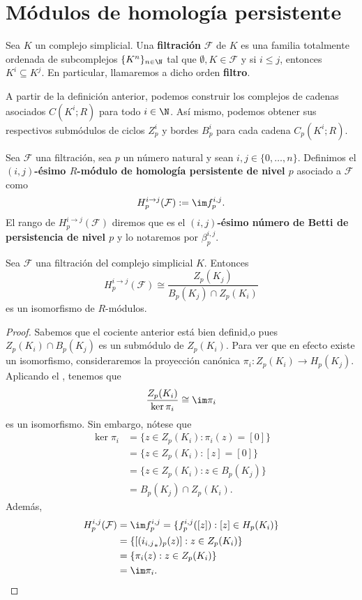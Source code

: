 \section{Módulos de homología persistente}
\begin{definicion}
	Sea \(K\) un complejo simplicial. Una \textbf{filtración} \(\mathcal{F}\) de \(K\) es una familia totalmente ordenada de subcomplejos \(\{K^n\}_{n \in \N}\) tal que \(\emptyset, K \in \mathcal{F}\) y si \(i \leq j\), entonces \(K^i \subseteq K^j\). En particular, llamaremos a dicho orden \textbf{filtro}.
\end{definicion}
A partir de la definición anterior, podemos construir los complejos de cadenas asociados \(C(K^i;R)\) para todo \(i \in \N\). Así mismo, podemos obtener sus respectivos submódulos de ciclos \(Z^i_p\) y bordes \(B^i_p\) para cada cadena \(C_p(K^i;R)\).
\begin{definicion}
	Sea \(\mathcal{F}\) una filtración, sea \(p\) un número natural y sean \(i,j \in \{0, \dots, n\}\). Definimos el  \textbf{\((i,j)\)-ésimo \(R\)-módulo de homología persistente de nivel \(p\)} asociado a \(\mathcal{F}\) como
	\[
		H_p^{i \to j}(\mathcal{F}) := \im f_p^{i,j}.
	\]
	El rango de \(H_p^{i \to j}(\mathcal{F})\) diremos que es el \textbf{\((i,j)\)-ésimo número de Betti de persistencia de nivel \(p\)} y lo notaremos por \(\beta_p^{i,j}\).
\end{definicion}
\begin{proposicion}
	Sea \(\mathcal{F}\) una filtración del complejo simplicial \(K\). Entonces
	\[
		H_p^{i \to j}(\mathcal{F}) \cong \frac{Z_p(K_j)}{B_p(K_j) \cap Z_p(K_i)}
	\]
	es un isomorfismo de \(R\)-módulos.
\end{proposicion}
\begin{proof}
	Sabemos que el cociente anterior está bien definid,o pues \(Z_p(K_i) \cap B_p(K_j)\) es un submódulo de \(Z_p(K_i)\). Para ver que en efecto existe un isomorfismo, consideraremos la proyección canónica \(\pi_i : Z_p(K_i) \to H_p(K_j)\). Aplicando el , tenemos que 
	\[
		\frac{Z_p(K_i)}{\ker \pi_i} \cong \im \pi_i
	\]
	es un isomorfismo. Sin embargo, nótese que
	\begin{align*}
		\ker \pi_i &= \{z \in Z_p(K_i) : \pi_i(z) = [0] \} \\
				   &= \{z \in Z_p(K_i) : [z] = [0] \} \\ 
				   &= \{z \in Z_p(K_i) : z \in B_p(K_j) \} \\ 
				   &= B_p(K_j) \cap Z_p(K_i).
	\end{align*}
	Además, 
	\begin{align*}
		H_p^{i,j}(\mathcal{F}) &= \im f_p^{i,j} = \{f_p^{i,j}([z]) : [z] \in H_p(K_i) \} \\ 
							   &= \{[({i_{i,j}}_*)_p(z)] : z \in Z_p(K_i) \} \\ 
							   &= \{\pi_i(z) : z \in Z_p(K_i) \} \\
							   &= \im \pi_i.
	\end{align*}
\end{proof}
